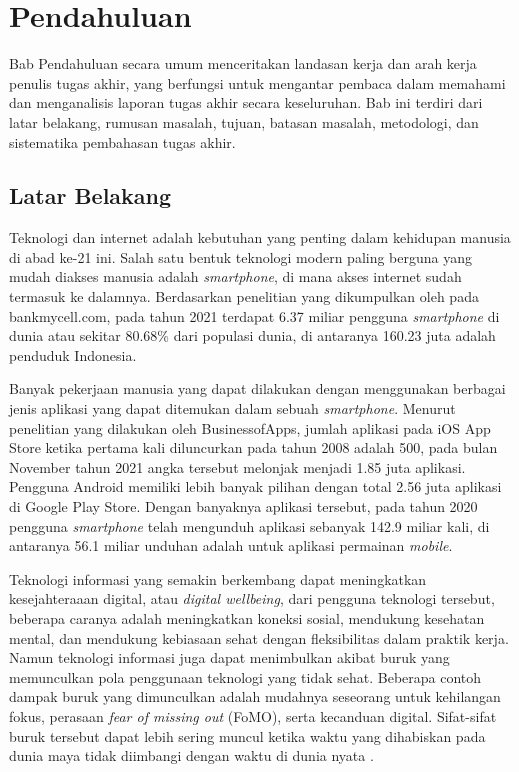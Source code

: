 \chapter{Pendahuluan}

Bab Pendahuluan secara umum menceritakan landasan kerja dan arah kerja penulis tugas akhir, yang berfungsi untuk mengantar pembaca dalam memahami dan menganalisis laporan tugas akhir secara keseluruhan. Bab ini terdiri dari latar belakang, rumusan masalah, tujuan, batasan masalah, metodologi, dan sistematika pembahasan tugas akhir.

\section{Latar Belakang}
\label{sec:latarbelakang}

Teknologi dan internet adalah kebutuhan yang penting dalam kehidupan manusia di abad ke-21 ini. Salah satu bentuk teknologi modern paling berguna yang mudah diakses manusia adalah \emph{smartphone}, di mana akses internet sudah termasuk ke dalamnya. Berdasarkan penelitian yang dikumpulkan oleh \textcite{turner2022howmanysmartphones} pada bankmycell.com, pada tahun 2021 terdapat 6.37 miliar pengguna \emph{smartphone} di dunia atau sekitar 80.68\% dari populasi dunia, di antaranya 160.23 juta adalah penduduk Indonesia.

Banyak pekerjaan manusia yang dapat dilakukan dengan menggunakan berbagai jenis aplikasi yang dapat ditemukan dalam sebuah \emph{smartphone}. Menurut penelitian yang dilakukan oleh BusinessofApps, jumlah aplikasi pada iOS App Store ketika pertama kali diluncurkan pada tahun 2008 adalah 500, pada bulan November tahun 2021 angka tersebut melonjak menjadi 1.85 juta aplikasi. Pengguna Android memiliki lebih banyak pilihan dengan total 2.56 juta aplikasi di Google Play Store. Dengan banyaknya aplikasi tersebut, pada tahun 2020 pengguna \emph{smartphone} telah mengunduh aplikasi sebanyak 142.9 miliar kali, di antaranya 56.1 miliar unduhan adalah untuk aplikasi permainan \emph{mobile}.

Teknologi informasi yang semakin berkembang dapat meningkatkan kesejahteraaan digital, atau \textit{digital wellbeing}, dari pengguna teknologi tersebut, beberapa caranya adalah meningkatkan koneksi sosial, mendukung kesehatan mental, dan mendukung kebiasaan sehat dengan fleksibilitas dalam praktik kerja. Namun teknologi informasi juga dapat menimbulkan akibat buruk yang memunculkan pola penggunaan teknologi yang tidak sehat. Beberapa contoh dampak buruk yang dimunculkan adalah mudahnya seseorang untuk kehilangan fokus, perasaan \emph{fear of missing out} (FoMO), serta kecanduan digital. Sifat-sifat buruk tersebut dapat lebih sering muncul ketika waktu yang dihabiskan pada dunia maya tidak diimbangi dengan waktu di dunia nyata \parencite{ALMOURAD2021101778}.

